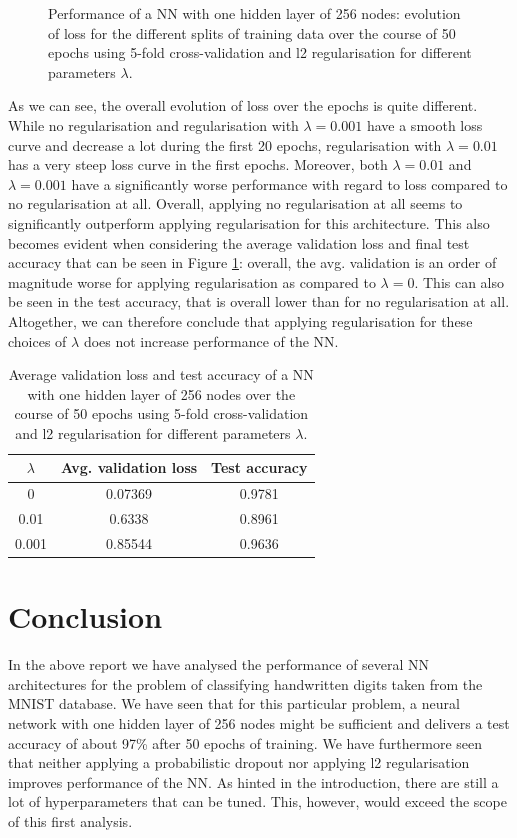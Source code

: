 \documentclass[12pt]{article}
\begin{document}
\begin{figure}[ht]
    \caption{Performance of a NN with one hidden layer of 256 nodes: evolution of loss for the different splits of training data over the course of 50 epochs using 5-fold cross-validation and l2 regularisation for different parameters $\lambda$.}
    \label{fig:regularisation}
\end{figure}

As we can see, the overall evolution of loss over the epochs is quite different. While no regularisation and regularisation with $\lambda = 0.001$ have a smooth loss curve and decrease a lot during the first 20 epochs, regularisation with $\lambda = 0.01$ has a very steep loss curve in the first epochs. Moreover, both $\lambda = 0.01$ and $\lambda = 0.001$ have a significantly worse performance with regard to loss compared to no regularisation at all. Overall, applying no regularisation at all seems to significantly outperform applying regularisation for this architecture. This also becomes evident when considering the average validation loss and final test accuracy that can be seen in Figure \ref{fig:regularisation}: overall, the avg. validation is an order of magnitude worse for applying regularisation as compared to $\lambda = 0$. This can also be seen in the test accuracy, that is overall lower than for no regularisation at all. Altogether, we can therefore conclude that applying regularisation for these choices of $\lambda$ does not increase performance of the NN. 

\begin{table}[ht]
    \centering
    \begin{tabular}{c|c|c}
        \textbf{$\lambda$}  & \textbf{Avg. validation loss} & \textbf{Test accuracy} \\ \hline
        0 &   0.07369 & 0.9781  \\
        0.01 & 0.6338 & 0.8961   \\
        0.001 & 0.85544 & 0.9636
    \end{tabular}
     \caption{Average validation loss and test accuracy of a NN with one hidden layer of 256 nodes over the course of 50 epochs using 5-fold cross-validation and l2 regularisation for different parameters $\lambda$.}
        \label{tab:exercisee}
\end{table}




\section{Conclusion}
In the above report we have analysed the performance of several NN architectures for the problem of classifying handwritten digits taken from the MNIST database. We have seen that for this particular problem, a neural network with one hidden layer of 256 nodes might be sufficient and delivers a test accuracy of about 97\% after 50 epochs of training. We have furthermore seen that neither applying a probabilistic dropout nor applying l2 regularisation improves performance of the NN. As hinted in the introduction, there are still a lot of hyperparameters that can be tuned. This, however, would exceed the scope of this first analysis.



\end{document}
